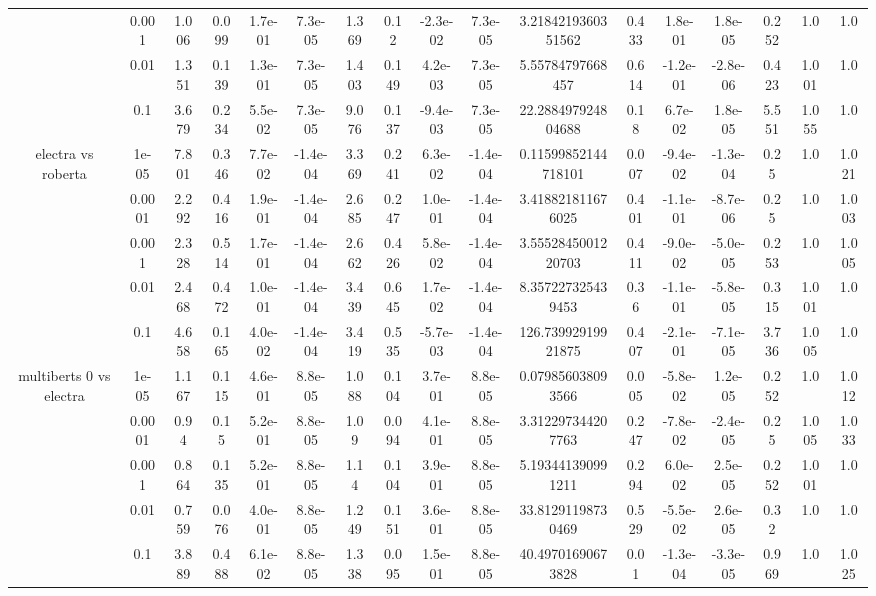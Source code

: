 \begin{tabular}{|c|c|c|c|c|c|c|c|c|c|c|c|c|c|c|c|c|}
 & 0.001 & 1.006 & 0.099 & 1.7e-01 & 7.3e-05 & 1.369 & 0.12 & -2.3e-02 & 7.3e-05 & 3.2184219360351562 & 0.433 & 1.8e-01 & 1.8e-05 & 0.252 & 1.0 & 1.0 \\
 & 0.01 & 1.351 & 0.139 & 1.3e-01 & 7.3e-05 & 1.403 & 0.149 & 4.2e-03 & 7.3e-05 & 5.55784797668457 & 0.614 & -1.2e-01 & -2.8e-06 & 0.423 & 1.001 & 1.0 \\
 & 0.1 & 3.679 & 0.234 & 5.5e-02 & 7.3e-05 & 9.076 & 0.137 & -9.4e-03 & 7.3e-05 & 22.288497924804688 & 0.18 & 6.7e-02 & 1.8e-05 & 5.551 & 1.055 & 1.0 \\
\hline
\multirow{5}{*}{electra  vs roberta } & 1e-05 & 7.801 & 0.346 & 7.7e-02 & -1.4e-04 & 3.369 & 0.241 & 6.3e-02 & -1.4e-04 & 0.11599852144718101 & 0.007 & -9.4e-02 & -1.3e-04 & 0.25 & 1.0 & 1.021 \\
 & 0.0001 & 2.292 & 0.416 & 1.9e-01 & -1.4e-04 & 2.685 & 0.247 & 1.0e-01 & -1.4e-04 & 3.418821811676025 & 0.401 & -1.1e-01 & -8.7e-06 & 0.25 & 1.0 & 1.003 \\
 & 0.001 & 2.328 & 0.514 & 1.7e-01 & -1.4e-04 & 2.662 & 0.426 & 5.8e-02 & -1.4e-04 & 3.5552845001220703 & 0.411 & -9.0e-02 & -5.0e-05 & 0.253 & 1.0 & 1.005 \\
 & 0.01 & 2.468 & 0.472 & 1.0e-01 & -1.4e-04 & 3.439 & 0.645 & 1.7e-02 & -1.4e-04 & 8.357227325439453 & 0.36 & -1.1e-01 & -5.8e-05 & 0.315 & 1.001 & 1.0 \\
 & 0.1 & 4.658 & 0.165 & 4.0e-02 & -1.4e-04 & 3.419 & 0.535 & -5.7e-03 & -1.4e-04 & 126.73992919921875 & 0.407 & -2.1e-01 & -7.1e-05 & 3.736 & 1.005 & 1.0 \\
\hline
\multirow{5}{*}{multiberts 0 vs electra } & 1e-05 & 1.167 & 0.115 & 4.6e-01 & 8.8e-05 & 1.088 & 0.104 & 3.7e-01 & 8.8e-05 & 0.079856038093566 & 0.005 & -5.8e-02 & 1.2e-05 & 0.252 & 1.0 & 1.012 \\
 & 0.0001 & 0.94 & 0.15 & 5.2e-01 & 8.8e-05 & 1.09 & 0.094 & 4.1e-01 & 8.8e-05 & 3.312297344207763 & 0.247 & -7.8e-02 & -2.4e-05 & 0.25 & 1.005 & 1.033 \\
 & 0.001 & 0.864 & 0.135 & 5.2e-01 & 8.8e-05 & 1.14 & 0.104 & 3.9e-01 & 8.8e-05 & 5.193441390991211 & 0.294 & 6.0e-02 & 2.5e-05 & 0.252 & 1.001 & 1.0 \\
 & 0.01 & 0.759 & 0.076 & 4.0e-01 & 8.8e-05 & 1.249 & 0.151 & 3.6e-01 & 8.8e-05 & 33.81291198730469 & 0.529 & -5.5e-02 & 2.6e-05 & 0.32 & 1.0 & 1.0 \\
 & 0.1 & 3.889 & 0.488 & 6.1e-02 & 8.8e-05 & 1.338 & 0.095 & 1.5e-01 & 8.8e-05 & 40.49701690673828 & 0.01 & -1.3e-04 & -3.3e-05 & 0.969 & 1.0 & 1.025 \\

\end{tabular}
